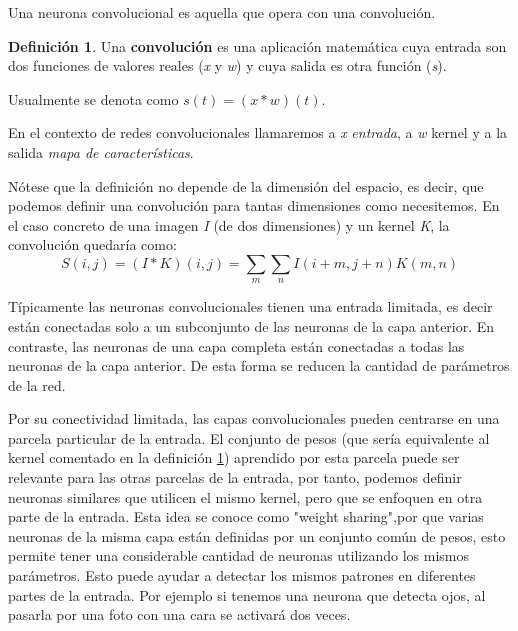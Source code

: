 \documentclass[12,twoside]{TFG-GM}
\theoremstyle{definition}
\newtheorem{definition}[theorem]{Definición}
\theoremstyle{remark}
\begin{document}
Una neurona convolucional es aquella que opera con una convolución\cite{wikiconv}.

\begin{definition} \label{def:convolution}
Una \textbf{convolución} es una aplicación matemática cuya entrada son dos funciones de valores reales (\textit{x} y \textit{w}) y cuya salida es otra función (\textit{s}). 

Usualmente se denota como $s(t) = (x * w)(t) $.

En el contexto de redes convolucionales llamaremos a \textit{x} \textit{entrada}, a \textit{w} kernel y a la salida \textit{mapa de características}.
\end{definition}

Nótese que la definición no depende de la dimensión del espacio, es decir, que podemos definir una convolución para tantas dimensiones como necesitemos.
En el caso concreto de una imagen \textit{I} (de dos dimensiones) y un kernel \textit{K}, la convolución quedaría como: 
$$
S(i,j) = (I * K)(i,j) = \sum_m \sum_n I(i +m, j+n) K(m,n)
$$



 

Típicamente las neuronas convolucionales tienen una entrada limitada, es decir están conectadas solo a un subconjunto de las neuronas de la capa anterior. En contraste, las neuronas de una capa completa están conectadas a todas las neuronas de la capa anterior. %
De esta forma se reducen la cantidad de parámetros de la red.



Por su conectividad limitada, las capas convolucionales pueden centrarse en una parcela particular de la entrada. El conjunto de pesos (que sería equivalente al kernel comentado en la definición \ref{def:convolution}) aprendido por esta parcela puede ser relevante para las otras parcelas de la entrada, por tanto, podemos definir neuronas similares que utilicen el mismo kernel, pero que se enfoquen en otra parte de la entrada. Esta idea se conoce como "weight sharing",por que varias neuronas de la misma capa están definidas por un conjunto común de pesos, esto permite tener una considerable cantidad de neuronas utilizando los mismos parámetros. Esto puede ayudar a detectar los mismos patrones en diferentes partes de la entrada. Por ejemplo si tenemos una neurona que detecta ojos, al pasarla por una foto con una cara se activará dos veces.  
\end{document}
